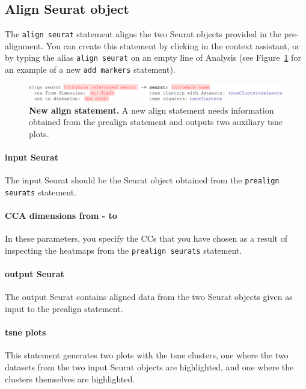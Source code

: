 \subsection{Align Seurat object}
The \texttt{align seurat} statement aligns the two Seurat objects provided in the pre-alignment.
You can create this statement by clicking
 in the context assistant, or by typing
the alias \texttt{align seurat} on an empty line of Analysis (see Figure~\ref{fig:AlignSeurat}
for an example of a new \texttt{add markers} statement).

\begin{figure}[h!tbp]
  \centering
    \includegraphics[width=\figWidthWide]{figures/AlignSeurat.pdf}
    \caption[New align statement.]{\textbf{New align statement.} A new align statement
    needs information obtained from the prealign statement and outputs two auxiliary
    tsne plots.}
\label{fig:AlignSeurat}
\end{figure}

\paragraph{input Seurat} The input Seurat should be the Seurat object obtained from the
\texttt{prealign seurats} statement.

\paragraph{CCA dimensions from - to} In these parameters, you specify the CCs that you have
chosen as a result of inspecting the heatmaps from the \texttt{prealign seurats} statement.

\paragraph{output Seurat} The output Seurat contains aligned data from the two Seurat objects
given as input to the prealign statement.

\paragraph{tsne plots} This statement generates two plots with the tsne clusters, one where
the two datasets from the two input Seurat objects are highlighted, and one where the clusters
themselves are highlighted.

